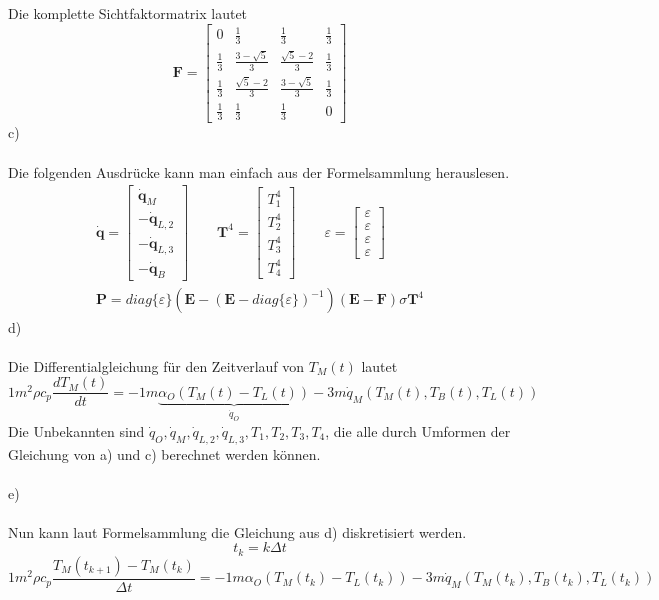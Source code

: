 \newpage
\noindent
Die komplette Sichtfaktormatrix lautet
\[
	\textbf{F} = \left[\begin{matrix}
	0 & \frac{1}{3} & \frac{1}{3} & \frac{1}{3} \\
	\frac{1}{3} & \frac{3 - \sqrt{5}}{3} & \frac{\sqrt{5} - 2}{3} & \frac{1}{3} \\
	\frac{1}{3} & \frac{\sqrt{5} - 2}{3} & \frac{3 - \sqrt{5}}{3} & \frac{1}{3} \\
	\frac{1}{3} & \frac{1}{3} & \frac{1}{3} & 0
	\end{matrix}\right]
\]
c) \\ \\
Die folgenden Ausdrücke kann man einfach aus der Formelsammlung herauslesen. 
\begin{align*}
	\dot{\textbf{q}} = \left[\begin{matrix}
		\dot{\textbf{q}}_M \\
		-\dot{\textbf{q}}_{L,2} \\
		-\dot{\textbf{q}}_{L,3} \\
		-\dot{\textbf{q}}_B
	\end{matrix}\right]
	\qquad
	\textbf{T}^4 = \left[\begin{matrix}
		T_1^4 \\
		T_2^4 \\
		T_3^4 \\
		T_4^4
	\end{matrix}\right]
	\qquad
	\varepsilon = \left[\begin{matrix}
		\varepsilon \\
		\varepsilon \\
		\varepsilon \\
		\varepsilon
	\end{matrix}\right] \\
	\textbf{P} = diag\{\varepsilon\}\left(\textbf{E} - \left(\textbf{E} - diag\{\varepsilon\}\right)^{-1}\right)\left(\textbf{E}-\textbf{F}\right)\sigma\textbf{T}^4
\end{align*}
d) \\ \\
Die Differentialgleichung für den Zeitverlauf von \(T_M\left(t\right)\) lautet
\[
	1m^2\rho c_p \frac{dT_M\left(t\right)}{dt} = -1m\underbrace{\alpha_O\left(T_M\left(t\right) - T_L\left(t\right)\right)}_{\dot{q}_O} -3m\dot{q}_M\left(T_M\left(t\right),T_B\left(t\right),T_L\left(t\right)\right)
\]
Die Unbekannten sind \(\dot{q}_O,\dot{q}_M,\dot{q}_{L,2},\dot{q}_{L,3},T_1,T_2,T_3,T_4\), die alle durch Umformen der Gleichung von a) und c) berechnet werden können. \\ \\
e) \\ \\
Nun kann laut Formelsammlung die Gleichung aus d) diskretisiert werden.
\[
	t_k = k\Delta t
\]
\[
	1m^2\rho c_p \frac{T_M\left(t_{k+1}\right) - T_M\left(t_k\right)}{\Delta t} = -1m\alpha_O\left(T_M\left(t_k\right) - T_L\left(t_k\right)\right) -3m\dot{q}_M\left(T_M\left(t_k\right),T_B\left(t_k\right),T_L\left(t_k\right)\right)
\]